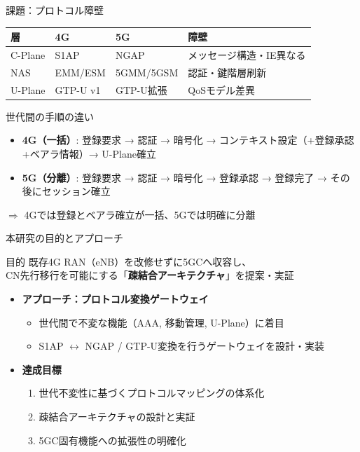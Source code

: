 \documentclass[dvipdfmx,11pt,aspectratio=169]{beamer}
\begin{document}
\begin{frame}{課題：プロトコル障壁}
  \begin{table}
    \tiny
    \begin{tabular}{|l|l|l|p{3.5cm}|}
      \hline
      \textbf{層} & \textbf{4G} & \textbf{5G} & \textbf{障壁} \\
      \hline
      C-Plane & S1AP & NGAP & メッセージ構造・IE異なる \\
      \hline
      NAS & EMM/ESM & 5GMM/5GSM & 認証・鍵階層刷新 \\
      \hline
      U-Plane & GTP-U v1 & GTP-U拡張 & QoSモデル差異 \\
      \hline
    \end{tabular}
  \end{table}

  \vspace{0.3cm}
  \begin{block}{世代間の手順の違い}
    \begin{itemize}
      \item \textbf{4G（一括）}: 登録要求 → 認証 → 暗号化 → コンテキスト設定（+登録承認+ベアラ情報）→ U-Plane確立
      \item \textbf{5G（分離）}: 登録要求 → 認証 → 暗号化 → 登録承認 → 登録完了 → \alert{その後に}セッション確立
    \end{itemize}
    $\Rightarrow$ 4Gでは登録とベアラ確立が一括、5Gでは\alert{明確に分離}
  \end{block}
\end{frame}

\begin{frame}{本研究の目的とアプローチ}
  \begin{block}{目的}
    既存4G RAN（eNB）を\alert{改修せず}に5GCへ収容し、\\
    CN先行移行を可能にする「\textbf{疎結合アーキテクチャ}」を提案・実証
  \end{block}

  \vspace{0.3cm}
  \begin{itemize}
    \item \textbf{アプローチ：プロトコル変換ゲートウェイ}
      \begin{itemize}
        \item 世代間で不変な機能（AAA, 移動管理, U-Plane）に着目
        \item S1AP $\leftrightarrow$ NGAP / GTP-U変換を行うゲートウェイを設計・実装
      \end{itemize}
    \item \textbf{達成目標}
      \begin{enumerate}
        \item 世代不変性に基づくプロトコルマッピングの体系化
        \item 疎結合アーキテクチャの設計と実証
        \item 5GC固有機能への拡張性の明確化
      \end{enumerate}
  \end{itemize}
\end{frame}
\end{document}
